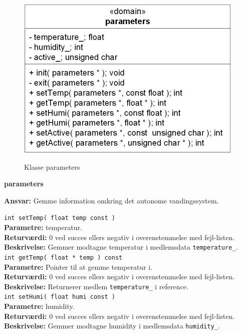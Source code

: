 
\begin{figure}[htbp] \centering
{\includegraphics[scale=1.3]{filer/design/Klassediagrammer/sw_psoc_parameters}}
\caption{Klasse parameters}
\label{fig:sw_psoc_class_parameters}
\end{figure} 

{\centering
\textbf{parameters}\par
}
\textbf{Ansvar:} Gemme information omkring det autonome vandingssystem. \

\verb+int setTemp( float temp const ) +\\
\textbf{Parametre:} temperatur. \\
\textbf{Returværdi:} 0 ved succes ellers negativ i overenstemmelse med fejl-listen. \\
\textbf{Beskrivelse:} Gemmer modtagne temperatur i medlemsdata \verb+temperature_+. \\

\verb+int getTemp( float * temp ) const+ \\
\textbf{Parametre:} Pointer til at gemme temperatur i. \\
\textbf{Returværdi:} 0 ved succes ellers negativ i overenstemmelse med fejl-listen. \\
\textbf{Beskrivelse:} Returnerer medlem \verb+temperature_+ i reference. \\

\verb+int setHumi( float humi const )+ \\
\textbf{Parametre:} humidity. \\
\textbf{Returværdi:} 0 ved succes ellers negativ i overenstemmelse med fejl-listen. \\
\textbf{Beskrivelse:} Gemmer modtagne humidity i medlemsdata \verb+humidity_+. \\

